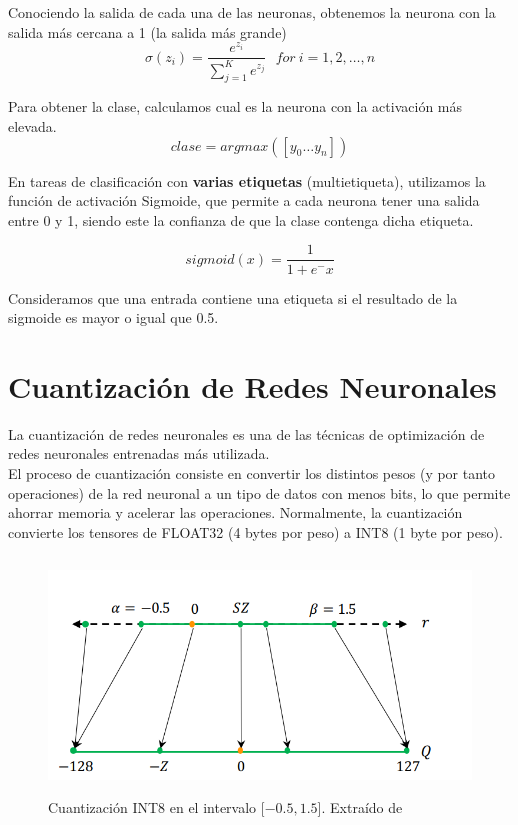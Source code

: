 Conociendo la salida de cada una de las neuronas, obtenemos la neurona
con la salida más cercana a 1 (la salida más grande)
\begin{equation}
   \sigma(z_i) = \frac{e^{z_{i}}}{\sum_{j=1}^K e^{z_{j}}} \ \ \ for\ i=1,2,\dots,n
   \label{eq:softmax}
\end{equation}



Para obtener la clase, calculamos cual es la neurona con la activación más elevada.
\begin{equation}
    clase = argmax([y_0 \dots y_n])
\end{equation}



En tareas de clasificación con \textbf{varias etiquetas} (multietiqueta), utilizamos la
función de activación Sigmoide, que permite a cada neurona tener una
salida entre 0 y 1, siendo este la confianza de que la clase contenga
dicha etiqueta.

\begin{equation}
    sigmoid(x) =  \frac{\mathrm{1} }{\mathrm{1} + e^-x }
    \label{eq:sigmoid}
\end{equation}    

Consideramos que una entrada contiene una etiqueta si el resultado de la sigmoide es mayor o igual que 0.5.


\hypertarget{cuantizacion-de-redes-neuronales}{%
\section{Cuantización de Redes
Neuronales}\label{cuantizacion-de-redes-neuronales}}

La cuantización de redes neuronales es una de las técnicas de
optimización de redes neuronales entrenadas más utilizada.\\
El proceso de cuantización consiste en convertir los distintos pesos (y
por tanto operaciones) de la red neuronal a un tipo de datos con menos
bits, lo que permite ahorrar memoria y acelerar las operaciones.
Normalmente, la cuantización convierte los tensores de FLOAT32 (4 bytes
por peso) a INT8 (1 byte por peso).

\begin{figure}
    \centering

    \includegraphics[width=5in,height=2.46875in]{img/3/quant.png}
    \caption{Cuantización INT8 en el intervalo $[-0.5,1.5$]. Extraído de \cite{quant_survey}}
    \label{fig:quant}
\end{figure}

